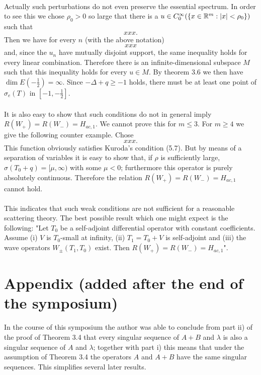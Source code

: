 \documentclass[11pt,twoside]{article}
\begin{document}
\paragraph*{}
Actually such perturbations do not even preserve the essential spectrum.
In order to see this we chose $\rho_0 > 0$ so large that there is a
$u \in C_0^{\infty}(\{x \in \R^m: \abs{x} < \rho_0\})$ such that
\[
xxx.
\]
Then we have for every $n$ (with the above notation)
\[
xxx
\]
and, since the $u_n$ have mutually disjoint support,
the same inequality holds for every linear combination.
Therefore there is an infinite-dimensional subspace $M$ such that this inequality
holds for every $u \in M$.
By theorem 3.6 we then have $\dim E(-\frac{1}{2}) = \infty$.
Since $-\Delta +q \geq -1$ holds, there must be at least one point of
$\sigma_e(T)$ in $[-1,-\frac{1}{2}]$.

\paragraph*{}
It is also easy to show that such conditions do not in general imply
$R(W_+) = R(W_-) = H_{ac,1}$.
We cannot prove this for $m \leq 3$.
For $m \geq 4$ we give the following counter example. Chose
\[
xxx.
\]
This function obviously satisfies Kuroda's condition (5.7).
But by means of a separation of variables it is easy to show
that, if $\rho$ is sufficiently large,
$\sigma(T_0+q) = [\mu,\infty)$ with some $\mu < 0$;
furthermore this operator is purely absolutely continuous.
Therefore the relation $R(W_+) = R(W_-) = H_{ac,1}$ cannot hold.

\paragraph*{}
This indicates that such weak conditions are not sufficient for a reasonable
scattering theory. The best possible result which one might expect is
the following:
"Let $T_0$ be a self-adjoint differential operator with constant coefficients.
Assume (i) $V$ is $T_0$-small at infinity, (ii) $T_1 = T_0+V$ is self-adjoint
and (iii) the wave operators $W_{\pm}(T_1,T_0)$ exist.
Then $R(W_+) = R(W_-) = H_{ac,1}$".

\section{Appendix (added after the end of the symposium)}                      %
In the course of this symposium the author was able to conclude from part ii)
of the proof of Theorem 3.4 that every singular sequence of $A+B$ and $\lambda$
is also a singular sequence of $A$ and $\lambda$;
together with part i) this means that under the assumption of Theorem 3.4
the operators $A$ and $A+B$ have the same singular sequences.
This simplifies several later results.
\end{document}
